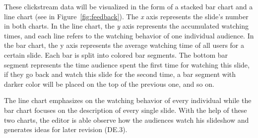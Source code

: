 These clickstream data will be visualized in the form of a stacked bar chart and a line chart (see in Figure~\ref{fig:feedback}).  
The \textit{x} axis represents the slide's number in both charts. In the line chart, the \textit{y} axis represents the accumulated watching times, and each line refers to the watching behavior of one individual audience. In the bar chart, the y axis represents the average watching time of all users for a certain slide. Each bar is split into colored bar segments. The bottom bar segment represents the time audience spent the first time for watching this slide, if they go back and watch this slide for the second time, a bar segment with darker color will be placed on the top of the previous one, and so on. 

The line chart emphasizes on the watching behavior of every individual while the bar chart focuses on the description of every single slide. 
With the help of these two charts, the editor is able observe how the audiences watch his slideshow and generates ideas for later revision (DE.3). 

